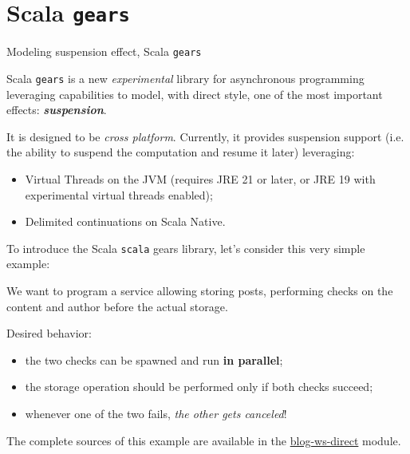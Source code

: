 \documentclass[aspectratio=1610,xcolor=dvipsnames,handout]{beamer}
\begin{document}
\section{Scala \texttt{gears}}
\begin{frame}{Modeling suspension effect, Scala \texttt{gears} \cite{gears}}
  \begin{block}{}
    Scala \texttt{gears} is a new \textit{experimental} library for asynchronous programming leveraging capabilities to model, with direct style, one of the most important effects: \textbf{\textit{suspension}}.
  \end{block}
  It is designed to be \emph{cross platform}. Currently, it provides suspension support (i.e. the ability to suspend the computation and resume it later) leveraging:
  \begin{itemize}
    \item Virtual Threads on the JVM (requires JRE 21 or later, or JRE 19 with experimental virtual threads enabled);
    \item Delimited continuations on Scala Native.
  \end{itemize}
\end{frame}
%
\begin{frame}
  To introduce the Scala \texttt{scala} gears library, let's consider this very simple example:
  \begin{example}[1]
    We want to program a service allowing storing posts, performing checks on the content and author before the actual storage.
  \end{example}
  Desired behavior:
  \begin{itemize}
    \item the two checks can be spawned and run \textbf{in parallel};
    \item the storage operation should be performed only if both checks succeed;
    \item whenever one of the two fails, \emph{the other gets canceled}!
  \end{itemize}
  \vspace*{0.5cm}
  \footnotesize
  The complete sources of this example are available in the \href{https://github.com/tassiLuca/direct-style-experiments/tree/master/blog-ws-direct}{blog-ws-direct} module.
\end{frame}
%
\end{document}
